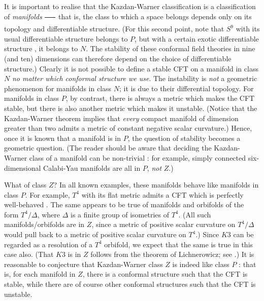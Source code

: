 \documentclass[a4paper,12pt]{article}
\theoremstyle{definition}
\renewcommand{\u}{\textit}
\renewcommand{\-}{$\dfrac{\quad\enspace}{\quad}$}
\begin{document}
It is important to realise that the Kazdan-Warner classification is a classification of \u{manifolds} \- that is, the class to which a space belongs depends only on its topology and differentiable structure. (For this second point, note that $S^9$ with its usual differentiable structure belongs to $P$, but with a certain exotic differentiable structure \cite{13}, it belongs to $N$. The stability of these conformal field theories in nine (and ten) dimensions can therefore depend on the choice of differentiable structure.) Clearly it is not possible to define a stable CFT on a manifold in class $N$ \u{no matter which conformal structure we use}. The instability is \u{not} a geometric phenomenon for manifolds in class $N$; it is due to their differential topology. For manifolds in class $P$, by contrast, there is always a metric which makes the CFT stable, but there is also another metric which makes it unstable. (Notice that the Kazdan-Warner theorem implies that \u{every} compact manifold of dimension greater than two admits a metric of constant negative scalar curvature.) Hence, once it is known that a manifold is in $P$, the question of stability becomes a geometric question. (The reader should be aware that deciding the Kazdan-Warner class of a manifold can be non-trivial :  for example, simply connected six-dimensional Calabi-Yau manifolds are all in $P$, \u{not} $Z$.)

What of class $Z$? In all known examples, these manifolds behave like manifolds in class $P$. For example, $T^4$ with its flat metric admits a CFT which is perfectly well-behaved \cite{14}. The same appears to be true of manifolds and orbifolds of the form $T^4/\Delta$, where $\Delta$ is a finite group of isometries of $T^4$. (All such manifolds/orbifolds are in $Z$, since a metric of positive scalar curvature on $T^4/\Delta$ would pull back to a metric of positive scalar curvature on $T^4$.) Since $K3$ can be regarded as a resolution of a $T^4$ orbifold, we expect that the same is true in this case also. (That $K3$ is in $Z$ follows from the theorem of Lichnerowicz; see \cite{12}.) It is reasonable to conjecture that Kazdan-Warner class $Z$ is indeed like class $P$ : that is, for each manifold in $Z$, there is a conformal structure such that the CFT is stable, while there are of course other conformal structures such that the CFT is unstable.
\end{document}
